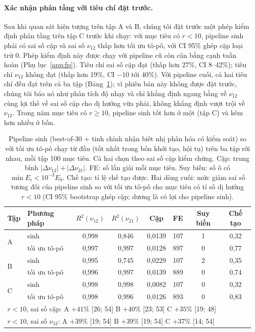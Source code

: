 \documentclass[a4paper,11pt]{article}
\newcommand{\nuot}{\nu_{12}}
\newcommand{\nuto}{\nu_{21}}
\newcommand{\RR}{R^2}
\begin{document}
\paragraph{Xác nhận phân tầng với tiêu chí đặt trước.}
Sau khi quan sát hiện tượng trên tập A và B, chúng tôi đặt trước một phép
kiểm định phân tầng trên tập C trước khi chạy: với mục tiêu có $r<10$, pipeline
sinh phải có sai số cặp và sai số $\nuot$ thấp hơn tối ưu tô-pô, với CI 95\%
ghép cặp loại trừ 0. Phép kiểm định này được chạy với pipeline cũ còn cân
bằng cạnh tuần hoàn (Phụ lục~\ref{app:fp}). Tiêu chí sai số cặp đạt (thấp hơn
27\%, CI 8--42\%); tiêu chí $\nuot$ không đạt (thấp hơn 19\%, CI $-10$ tới
40\%). Với pipeline cuối, cả hai tiêu chí đều đạt trên cả ba tập
(Bảng~\ref{tab:simp}); vì phiên bản này không được đặt trước, chúng tôi báo
nó như phân tích độ nhạy và chỉ khẳng định ngang bằng về $\nuot$ cùng lợi thế
về sai số cặp cho dị hướng vừa phải, không khẳng định vượt trội về $\nuot$.
Trong năm mục tiêu có $r\ge10$, pipeline sinh tốt hơn ở một (tập C) và kém
hơn nhiều ở bốn.

\begin{table}[t]
\centering
\caption{Pipeline sinh (best-of-30 + tinh chỉnh nhận biết nhị phân hóa có
kiểm soát) so với tối ưu tô-pô chạy từ đầu (tốt nhất trong bốn khởi tạo, hội
tụ) trên ba tập rời nhau, mỗi tập 100 mục tiêu. Cả hai chọn theo sai số cặp
kiểm chứng. Cặp: trung bình $|\Delta\nuot|+|\Delta\nuto|$. FE: số lần giải
mỗi mục tiêu. Suy biến: số ô có $\min E_i<10^{-3}E_0$. Chế tạo: tỉ lệ chế
tạo được. Hai dòng cuối: mức giảm sai số tương đối của pipeline sinh so với
tối ưu tô-pô cho mục tiêu có tỉ số dị hướng $r<10$ (CI 95\% bootstrap ghép
cặp; dương là có lợi cho pipeline sinh).}
\label{tab:simp}
\small
\setlength{\tabcolsep}{3.2pt}
\begin{tabular}{llcccccc}
\toprule
Tập & Phương pháp & $\RR(\nuot)$ & $\RR(\nuto)$ & Cặp & FE & Suy biến & Chế tạo\\
\midrule
\multirow{2}{*}{A} & sinh & 0,998 & 0,846 & 0,0139 & 107 & 1 & 0,32\\
 & tối ưu tô-pô & 0,997 & 0,997 & 0,0128 & 897 & 0 & 0,77\\
\multirow{2}{*}{B} & sinh & 0,995 & 0,745 & 0,0229 & 107 & 2 & 0,35\\
 & tối ưu tô-pô & 0,996 & 0,997 & 0,0139 & 889 & 0 & 0,74\\
\multirow{2}{*}{C} & sinh & 0,998 & 0,998 & 0,0082 & 107 & 0 & 0,32\\
 & tối ưu tô-pô & 0,998 & 0,996 & 0,0126 & 893 & 0 & 0,83\\
\midrule
\multicolumn{8}{l}{$r<10$, sai số cặp: \;A $+41\%$ [26; 54] \;B $+40\%$ [23; 53] \;C $+35\%$ [19; 48]}\\
\multicolumn{8}{l}{$r<10$, sai số $\nuot$: \;A $+39\%$ [19; 54] \;B $+39\%$ [19; 54] \;C $+37\%$ [14; 54]}\\
\bottomrule
\end{tabular}
\end{table}
\end{document}

